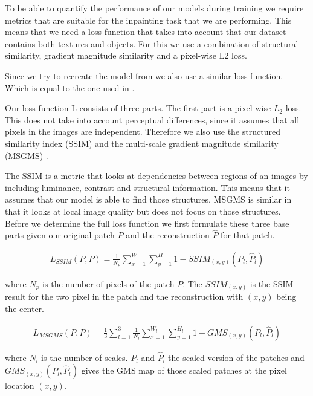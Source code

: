To be able to quantify the performance of our models during training we require metrics that are suitable for the inpainting task that we are performing. This means that we need a loss function that takes into account that our dataset contains both textures and objects. For this we use a combination of structural similarity, gradient magnitude similarity and a pixel-wise L2 loss.

Since we try to recreate the model from \cite{pirnay_inpainting_2021} we also use a similar loss function. Which is equal to the one used in \cite{zavrtanik_reconstruction_2021}.

Our loss function L consists of three parts. The first part is a pixel-wise $L_2$ loss. This does not take into account perceptual differences, since it assumes that all pixels in the images are independent. Therefore we also use the structured similarity index (SSIM) \cite{bergmann_improving_2019} and the multi-scale gradient magnitude similarity (MSGMS) \cite{xue_gradient_2014, zhang_gradient_2017}.

The SSIM is a metric that looks at dependencies between regions of an images by including luminance, contrast and structural information. This means that it assumes that our model is able to find those structures. MSGMS is similar in that it looks at local image quality but does not focus on those structures.
\\
Before we determine the full loss function we first formulate these three base parts given our original patch $P$ and the reconstruction $\hat{P}$ for that patch.

\begin{align}
L_{SSIM}(P, P) = \frac{1}{N_p} \sum_{x=1}^{W}\sum_{y=1}^{H}{} {1 - SSIM_{(x,y)}(P_l, \hat{P}_l)}
\end{align}

where $N_p$ is the number of pixels of the patch $P$. The $SSIM_(x,y)$ is the SSIM result for the two pixel in the patch and the reconstruction with $(x,y)$ being the center.

\begin{align}
L_{MSGMS}(P, P) = \frac{1}{3} \sum_{l=1}^{3} \frac{1}{N_l} \sum_{x=1}^{W_l}\sum_{y=1}^{H_l}{} {1 - GMS_{(x,y)}(P_l, \hat{P}_l)}
\end{align}

where $N_l$ is the number of scales. $P_l$ and $\hat{P}_l$ the scaled version of the patches and $GMS_{(x,y)}(P_l, \hat{P}_l)$ gives the GMS map of those scaled patches at the pixel location $(x,y)$.

